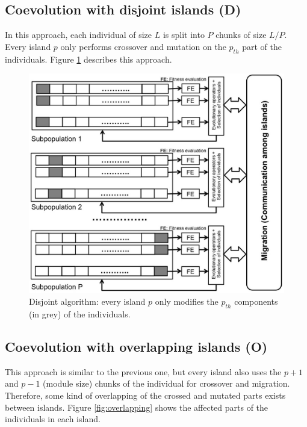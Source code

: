 \documentclass[Crown,sagev,times,doublespace]{sagej}
\begin{document}
\subsection{Coevolution with disjoint islands (D)} 
In this approach, each individual of size $L$ is split into $P$ chunks of size $L/P$. Every island $p$ only performs crossover and mutation on the $p_{th}$ part of the individuals. Figure \ref{fig:disjoint} describes this approach.  

\begin{figure}
\centering
\includegraphics[width=12cm]{islandDisjoint.jpg}
\caption{Disjoint algorithm: every island $p$ only modifies the $p_{th}$ components (in grey) of the individuals.}
\label{fig:disjoint}
\end{figure}

\subsection{Coevolution with overlapping islands (O)}
This approach is similar to the previous one, but every island also uses the $p+1$ and $p-1$ (module size) chunks of the individual for crossover and migration. Therefore, some kind of overlapping of the crossed and mutated parts exists between islands. Figure \ref{fig:overlapping} shows the affected parts of the individuals in
each island. 
\end{document}
